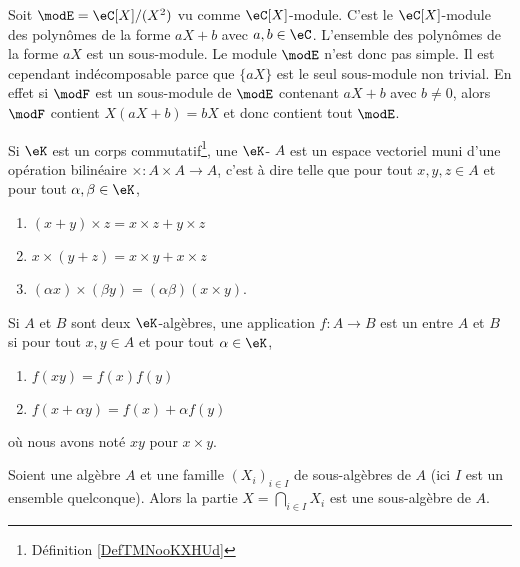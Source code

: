 \begin{example}
    Soit \( \modE=\eC[X]/(X^2)\) vu comme \( \eC[X]\)-module. C'est le \( \eC[X]\)-module des polynômes de la forme \( aX+b\) avec \( a,b\in \eC\). L'ensemble des polynômes de la forme \( aX\) est un sous-module. Le module \( \modE\) n'est donc pas simple. Il est cependant indécomposable parce que \( \{ aX \}\) est le seul sous-module non trivial. En effet si \( \modF\) est un sous-module de \( \modE\) contenant \( aX+b\) avec \( b\neq 0\), alors \( \modF\) contient \( X(aX+b)=bX\) et donc contient tout \( \modE\).
\end{example}

\begin{definition}   \label{DefAEbnJqI}
    Si \( \eK\) est un corps commutatif\footnote{Définition \ref{DefTMNooKXHUd}}, une \( \eK\)- \( A\) est un espace vectoriel muni d'une opération bilinéaire \( \times\colon A\times A\to A\), c'est à dire telle que pour tout \( x,y,z\in A\) et pour tout \( \alpha,\beta\in\eK\),
    \begin{enumerate}
        \item
            \( (x+y)\times z=x\times z+y\times z\)
        \item
            \( x\times (y+z)=x\times y+x\times z\)
        \item
            \( (\alpha x)\times (\beta y)=(\alpha\beta)(x\times y)\).
    \end{enumerate}
    Si \( A\) et \( B\) sont deux \( \eK\)-algèbres, une application \( f\colon A\to B\) est un  entre \( A\) et \( B\) si pour tout \( x,y\in A\) et pour tout \( \alpha\in \eK\),
    \begin{enumerate}
        \item
            \( f(xy)=f(x)f(y)\)
        \item
            \( f(x+\alpha y)=f(x)+\alpha f(y)\)
    \end{enumerate}
    où nous avons noté \( xy\) pour \( x\times y\).
\end{definition}

\begin{lemma}   \label{LEMooVKLKooSAHmpZ}
    Soient une algèbre \( A\) et une famille \( (X_i)_{i\in I}\) de sous-algèbres de \( A\) (ici \( I\) est un ensemble quelconque). Alors la partie \( X=\bigcap_{i\in I}X_i\) est une sous-algèbre de \( A\).
\end{lemma}

